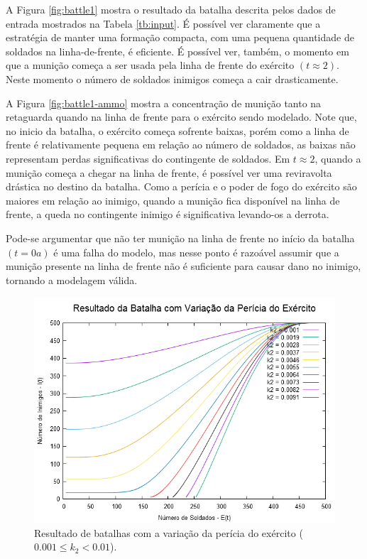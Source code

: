 \documentclass{article}
\begin{document}
A Figura \ref{fig:battle1} mostra o resultado da batalha descrita pelos dados de entrada mostrados na Tabela \ref{tb:input}. É possível ver claramente que a estratégia de manter uma formação compacta, com uma pequena quantidade de soldados na linha-de-frente, é eficiente. É possível ver, também, o momento em que a munição começa a ser usada pela linha de frente do exército $(t \approx 2)$. Neste momento o número de soldados inimigos começa a cair drasticamente.

A Figura \ref{fig:battle1-ammo} mostra a concentração de munição tanto na retaguarda quando na linha de frente para o exército sendo modelado. Note que, no inicio da batalha, o exército começa sofrente baixas, porém como a linha de frente é relativamente pequena em relação ao número de soldados, as baixas não representam perdas significativas do contingente de soldados. Em $t \approx 2$, quando a munição começa a chegar na linha de frente, é possível ver uma reviravolta drástica no destino da batalha. Como a perícia e o poder de fogo do exército são maiores em relação ao inimigo, quando a munição fica disponível na linha de frente, a queda no contingente inimigo é significativa levando-os a derrota.

Pode-se argumentar que não ter munição na linha de frente no início da batalha $(t=0a)$ é uma falha do modelo, mas nesse ponto é razoável assumir que a munição presente na linha de frente não é suficiente para causar dano no inimigo, tornando a modelagem válida.

\begin{figure}[ht]
	\centering
	\includegraphics[scale=0.3]{figs/battle_army_skill_variation.png}
	\caption{Resultado de batalhas com a variação da perícia do exército ($0.001 \leq k_2 < 0.01$).}
	\label{fig:army-skill-variation}
\end{figure}
\end{document}
